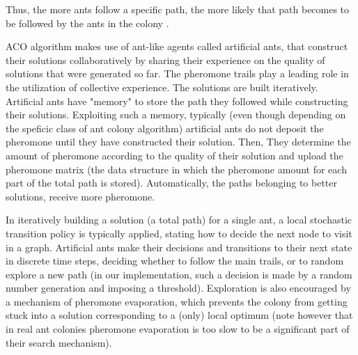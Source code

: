 Thus, the  more ants  follow  a  specific  path,  the  more  likely  that  path  becomes  to  be  followed  by  the  ants  in the colony \cite{ cinque,otto, nove}.  

ACO  algorithm  makes use  of ant-like  agents  called artificial ants, that construct their   solutions   collaboratively   by   sharing   their experience on the quality of solutions that were generated so far.
The pheromone trails play  a  leading  role  in  the  utilization  of collective experience.
The solutions are built iteratively.
Artificial  ants  have  "memory"  to  store  the  path  they  followed  while  constructing  their solutions.  Exploiting such a memory,  typically (even though depending on the speficic class of ant colony algorithm) artificial  ants  do not deposit  the pheromone until they have constructed their solution. Then, They determine the amount of pheromone according  to  the  quality  of  their  solution  and upload the pheromone matrix (the data structure in which the pheromone amount for each part of the total path is stored). 
Automatically, the  paths  belonging  to  better  solutions,  receive  more pheromone.

In iteratively building a solution (a total path) for a single ant, a  local  stochastic  transition  policy  is typically applied, stating how to decide the next node to visit in a graph. Artificial  ants  make  their  decisions  and  transitions  to  their  next  state  in  discrete  time steps, deciding whether to follow the main trails, or to random explore a new path (in our implementation, such a decision is made by a random number generation and imposing a threshold).
Exploration  is  also encouraged  by  a mechanism of  pheromone  evaporation, which prevents the  colony from  getting  stuck  into a solution  corresponding to a (only) local optimum (note however that in  real  ant  colonies  pheromone evaporation is too slow to be a significant part of their search mechanism).

